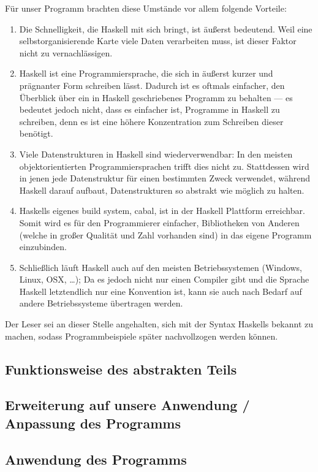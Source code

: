 \documentclass[twoside,a4paper,draft]{article}
\begin{document}
Für unser Programm brachten diese Umstände vor allem folgende Vorteile:

\begin{enumerate}
\item Die Schnelligkeit, die Haskell mit sich bringt, ist äußerst bedeutend. Weil eine selbstorganisierende Karte viele Daten verarbeiten muss, ist dieser Faktor nicht zu vernachlässigen.
\item Haskell ist eine Programmiersprache, die sich in äußerst kurzer und prägnanter Form schreiben lässt. Dadurch ist es oftmals einfacher, den Überblick über ein in Haskell geschriebenes Programm zu behalten --- es bedeutet jedoch nicht, dass es einfacher ist, Programme in Haskell zu schreiben, denn es ist eine höhere Konzentration zum Schreiben dieser benötigt.
\item Viele Datenstrukturen in Haskell sind wiederverwendbar: In den meisten objektorientierten Programmiersprachen trifft dies nicht zu. Stattdessen wird in jenen jede Datenstruktur für einen bestimmten Zweck verwendet, während Haskell darauf aufbaut, Datenstrukturen so abstrakt wie möglich zu halten.
\item Haskells eigenes \glqq{}build system\grqq{}, cabal, ist in der Haskell Plattform erreichbar. Somit wird es für den Programmierer einfacher, Bibliotheken von Anderen (welche in großer Qualität und Zahl vorhanden sind) in das eigene Programm einzubinden.
\item Schließlich läuft Haskell auch auf den meisten Betriebssystemen (Windows, Linux, OSX, \dots{}); Da es jedoch nicht nur einen Compiler gibt und die Sprache Haskell letztendlich nur eine Konvention ist, kann sie auch nach Bedarf auf andere Betriebssysteme übertragen werden.
\end{enumerate}

Der Leser sei an dieser Stelle angehalten, sich mit der Syntax Haskells bekannt zu machen, sodass Programmbeispiele später nachvollzogen werden können.

\subsection{Funktionsweise des abstrakten Teils}

\subsection{Erweiterung auf unsere Anwendung / Anpassung des Programms}

\subsection{Anwendung des Programms}
\end{document}
